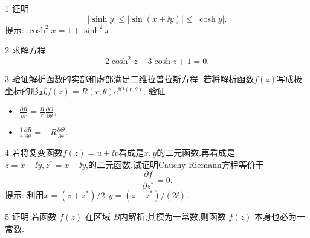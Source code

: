 \documentclass[11pt]{article}
\begin{document}
 

\begin{hwproblem}{1}
  证明
  $$
  |\sinh{y}| \leq |\sin(x+\ii y)| \leq |\cosh{y}|.
  $$
  提示: $\cosh^2{x} = 1+\sinh^2{x}$.
  \end{hwproblem}

\vspace{0.5cm}

\begin{hwproblem}{2}
  求解方程
  $$
  2 \cosh^2 z - 3\cosh z +1 = 0.
  $$
  \end{hwproblem}

\vspace{0.5cm}

\begin{hwproblem}{3}
  验证解析函数的实部和虚部满足二维拉普拉斯方程. 若将解析函数$f(z)$写成极坐标的形式$f(z) = R(r,\theta) e^{\ii \Theta(r,\theta)}$,
验证
\begin{itemize}
\item $\frac{\partial R}{\partial r}=\frac{R}{r} \frac{\partial \Theta}{\partial \theta}$,
\item $\frac{1}{r} \frac{\partial R}{\partial \theta}=-R \frac{\partial \Theta}{\partial r}$.
\end{itemize}
\end{hwproblem}

\vspace{0.5cm}

\begin{hwproblem}{4}
  若将复变函数$f(z)=u+\ii v$看成是$x,y$的二元函数.再看成是$z=x+\ii y, z^*= x-\ii y$,的二元函数,试证明Cauchy-Riemann方程等价于
  $$
  \frac{\partial f}{\partial z^{*}} = 0.
  $$ 
  提示: 利用$x=(z+z^*)/2, y=(z-z^*)/(2\ii)$.
\end{hwproblem}

\vspace{0.5cm}

\begin{hwproblem}{5}
  证明:若函数 $f ( z )$ 在区域 $B$内解析,其模为一常数,则函数 $f ( z )$ 本身也必为一常数.
\end{hwproblem}

\vspace{0.5cm}
\end{document}
